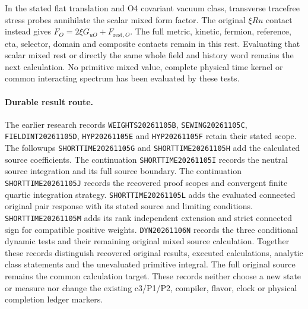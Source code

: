 In the stated flat translation and O4 covariant vacuum class, transverse
tracefree stress probes annihilate the scalar mixed form factor.
The original \(\xi Ru\) contact instead gives
\(F_O=2\xi G_{uO}+F_{\mathrm{rest},O}\).
The full metric, kinetic, fermion, reference, eta, selector, domain and
composite contacts remain in this rest. Evaluating that scalar mixed rest
or directly the same whole field and history word remains the next
calculation. No primitive mixed value, complete physical time kernel or
common interacting spectrum has been evaluated by these tests.

\paragraph{Durable result route.}
The earlier research records \texttt{WEIGHTS20261105B},
\texttt{SEWING20261105C}, \texttt{FIELDINT20261105D},
\texttt{HYP20261105E} and \texttt{HYP20261105F} retain their stated scope.
The followups \texttt{SHORTTIME20261105G} and
\texttt{SHORTTIME20261105H} add the calculated source coefficients.
The continuation \texttt{SHORTTIME20261105I} records the neutral source
integration and its full source boundary.
The continuation \texttt{SHORTTIME20261105J} records the recovered proof
scopes and convergent finite quartic integration strategy.
\texttt{SHORTTIME20261105L} adds the evaluated connected original pair
response with its stated source and limiting conditions.
\texttt{SHORTTIME20261105M} adds its rank independent extension and strict
connected sign for compatible positive weights.
\texttt{DYN20261106N} records the three conditional dynamic tests and their
remaining original mixed source calculation.
Together these records distinguish
recovered original results, executed calculations, analytic class
statements and the unevaluated primitive integral. The full original
source remains the common calculation target. These records neither
choose a new state or measure nor change the existing c3/P1/P2,
compiler, flavor, clock or physical completion ledger markers.
